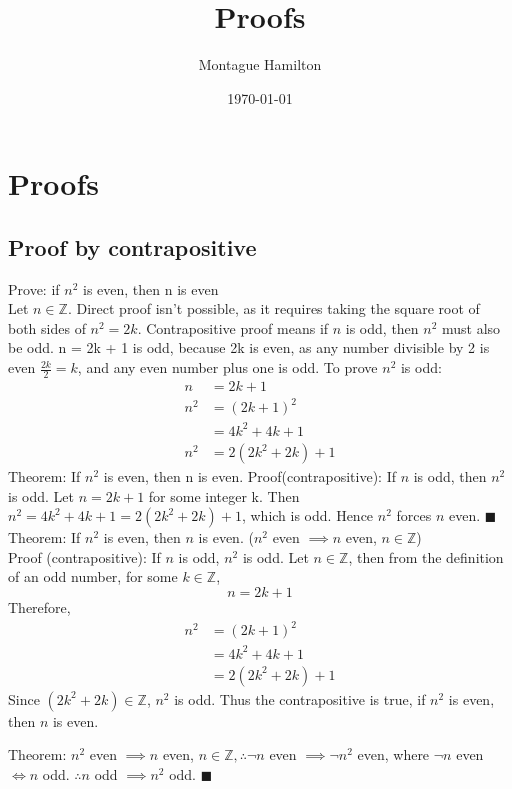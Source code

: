 \documentclass{article}
\begin{document}
\title{Proofs}
\author{Montague Hamilton}
\date{\today}
\maketitle

\section{Proofs}
\subsection{Proof by contrapositive}
Prove: if $n^{2}$ is even, then n is even \\
Let $n \in \mathbb{Z}$. Direct proof isn't possible, as it requires taking the square root of both sides of $n^{2} = 2k$. Contrapositive proof means if $n$ is odd, then $n^{2}$ must also be odd.
n = 2k + 1 is odd, because 2k is even, as any number divisible by 2 is even $\frac{2k}{2} = k$, and any even number plus one is odd. To prove $n^{2}$ is odd:
\begin{align*}
  n    &= 2k + 1 \\
  n^{2}   &= (2k + 1)^{2} \\
       &= 4k^{2} + 4k + 1 \\
  n^{2} &= 2(2k^{2} + 2k) + 1
\end{align*}
Theorem: If $n^{2}$ is even, then n is even. Proof(contrapositive): If $n$ is odd, then $n^{2}$ is odd. Let $n = 2k + 1$ for some integer k. Then $n^{2} = 4k^{2} + 4k + 1 = 2(2k^{2} + 2k) + 1$, which is odd. Hence $n^{2}$ forces $n$ even. $\blacksquare$ \\
\newline
Theorem: If $n^{2}$ is even, then $n$ is even. ($n^{2}$ even $\implies n$ even, $n \in \mathbb{Z}$) \\
Proof (contrapositive): If $n$ is odd, $n^{2}$ is odd. Let $n \in \mathbb{Z}$, then from the definition of an odd number, for some $k \in \mathbb{Z}$,
\[
  n = 2k + 1 
\]
Therefore,
\begin{align*}
  n^{2} &= (2k + 1)^{2} \\
     &= 4k^{2} + 4k + 1 \\
     &= 2(2k^{2} + 2k) + 1
\end{align*}
Since $(2k^{2} + 2k) \in \mathbb{Z}$, $n^{2}$ is odd. Thus the contrapositive is true, if $n^{2}$ is even, then $n$ is even.

Theorem: $n^{2}$ even $\implies n$ even, $n \in \mathbb{Z}, \therefore \neg n$ even $\implies \neg n^{2}$ even,
where $\neg n$ even $\iff n$ odd. $\therefore n$ odd $\implies n^{2}$ odd. $\blacksquare$
\end{document}
